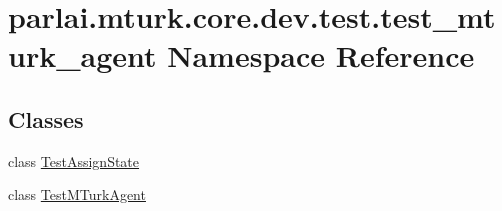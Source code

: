 \hypertarget{namespaceparlai_1_1mturk_1_1core_1_1dev_1_1test_1_1test__mturk__agent}{}\section{parlai.\+mturk.\+core.\+dev.\+test.\+test\+\_\+mturk\+\_\+agent Namespace Reference}
\label{namespaceparlai_1_1mturk_1_1core_1_1dev_1_1test_1_1test__mturk__agent}
\subsection*{Classes}
\begin{DoxyCompactItemize}
\item 
class \hyperlink{classparlai_1_1mturk_1_1core_1_1dev_1_1test_1_1test__mturk__agent_1_1TestAssignState}{Test\+Assign\+State}
\item 
class \hyperlink{classparlai_1_1mturk_1_1core_1_1dev_1_1test_1_1test__mturk__agent_1_1TestMTurkAgent}{Test\+M\+Turk\+Agent}
\end{DoxyCompactItemize}
